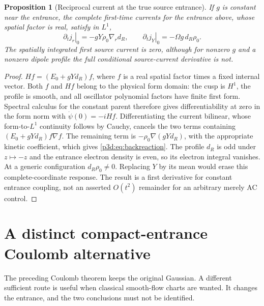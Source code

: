 \documentclass[11pt]{article}
\numberwithin{equation}{section}
\newtheorem{proposition}[theorem]{Proposition}
\theoremstyle{definition}
\theoremstyle{remark}
\begin{document}
\begin{proposition}[Reciprocal current at the true source entrance]
\label{p3d:prop:backreaction}
If $g$ is constant near the entrance, the complete first-time currents
for the entrance above, whose spatial factor is real, satisfy in $L^1$,
\begin{equation}\label{p3d:eq:backreaction}
 \left.\partial_tj_r\right|_0=-gY\rho_0\nabla_rd_R,\qquad
 \left.\partial_tj_Y\right|_0=-\Omega g\,d_R\rho_0.
\end{equation}
The spatially integrated first source current is zero, although
for nonzero $g$ and a nonzero dipole profile the full conditional
source-current derivative is not.
\end{proposition}
\begin{proof}
$Hf=(E_0+gYd_R)f$, where $f$ is a real spatial factor times a fixed
internal vector.
Both $f$ and $Hf$ belong to the physical form domain: the cusp is
$H^1$, the profile is smooth, and all oscillator polynomial factors
have finite first form. Spectral calculus for the constant parent
therefore gives differentiability at zero in the form norm with
$\dot\psi(0)=-iHf$. Differentiating the current bilinear, whose
form-to-$L^1$ continuity follows by Cauchy, cancels the two terms
containing $(E_0+gYd_R)f\nabla f$. The remaining term is
$-\rho_0\nabla(gYd_R)$, with the appropriate kinetic coefficient,
which gives \eqref{p3d:eq:backreaction}.
The profile $d_R$ is odd under $z\mapsto-z$ and the entrance electron
density is even, so its electron integral vanishes. At a generic
configuration $d_R\rho_0\neq0$. Replacing $Y$ by its mean would
erase this complete-coordinate response. The result is a first
derivative for constant entrance coupling, not an asserted
$O(t^2)$ remainder for an arbitrary merely AC control.
\end{proof}

\section{A distinct compact-entrance Coulomb alternative}
\label{p3d:sec:FR}

The preceding Coulomb theorem keeps the original Gaussian.
A different sufficient route is useful when classical smooth-flow
charts are wanted. It changes the entrance, and the two conclusions
must not be identified.
\end{document}
